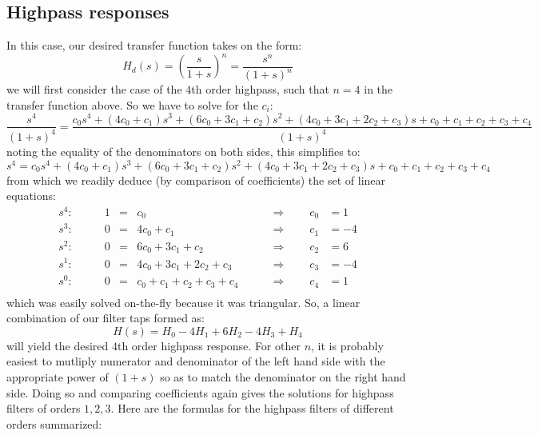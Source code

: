 \subsection{Highpass responses}
In this case, our desired transfer function takes on the form:
\begin{equation}
 H_d(s) = \left( \frac{s}{1+s} \right)^n = \frac{s^n}{(1+s)^n}
\end{equation}
we will first  consider the case of the $4$th order highpass, such that $n=4$ in the transfer function above. So we have to solve for the $c_i$:
\begin{equation}
 \frac{s^4}{(1+s)^4} = \frac{c_0 s^4 + (4c_0+c_1)s^3 + (6c_0+3c_1+c_2)s^2 + (4c_0+3c_1+2c_2+c_3)s + c_0+c_1+c_2+c_3+c_4}{(1+s)^4}
\end{equation}
noting the equality of the denominators on both sides, this simplifies to:
\begin{equation}
 s^4 = c_0 s^4 + (4c_0+c_1)s^3 + (6c_0+3c_1+c_2)s^2 + (4c_0+3c_1+2c_2+c_3)s + c_0+c_1+c_2+c_3+c_4
\end{equation}
from which we readily deduce (by comparison of coefficients) the set of linear equations:
\begin{equation}
 \begin{aligned}
   s^4: \qquad & 1 &=& c_0                    \qquad & \Rightarrow \qquad c_0 &= 1   \\
   s^3: \qquad & 0 &=& 4c_0+c_1               \qquad & \Rightarrow \qquad c_1 &= -4  \\
   s^2: \qquad & 0 &=& 6c_0+3c_1+c_2          \qquad & \Rightarrow \qquad c_2 &= 6   \\ 
   s^1: \qquad & 0 &=& 4c_0+3c_1+2c_2+c_3     \qquad & \Rightarrow \qquad c_3 &= -4  \\    
   s^0: \qquad & 0 &=&  c_0+c_1+c_2+c_3+c_4   \qquad & \Rightarrow \qquad c_4 &= 1   \\      
 \end{aligned}
\end{equation}
which was easily solved on-the-fly because it was triangular. So, a linear combination of our filter taps formed as:
\begin{equation}
 H(s) = H_0 - 4 H_1 + 6 H_2 - 4 H_3 + H_4
\end{equation}
will yield the desired $4$th order highpass response. For other $n$, it is probably easiest to mutliply numerator and denominator of the left hand side with the appropriate power of $(1+s)$ so as to match the denominator on the right hand side. Doing so and comparing coefficients again gives the solutions for highpass filters of orders $1,2,3$. Here are the formulas for the highpass filters of different orders summarized:
